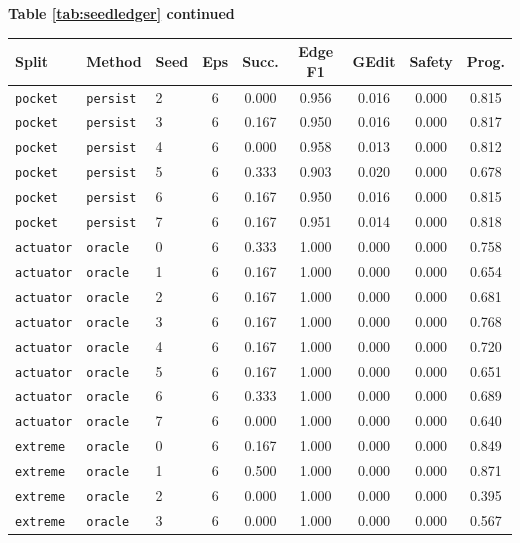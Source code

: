 \documentclass{article}
\begin{document}
\begin{center}
\textbf{Table \ref{tab:seedledger} continued}\\[0.4ex]
\begin{tabular}{lllcccccc}
\toprule
Split & Method & Seed & Eps & Succ. & Edge F1 & GEdit & Safety & Prog. \\
\midrule
\texttt{pocket} & \texttt{persist} & 2 & 6 & 0.000 & 0.956 & 0.016 & 0.000 & 0.815 \\
\texttt{pocket} & \texttt{persist} & 3 & 6 & 0.167 & 0.950 & 0.016 & 0.000 & 0.817 \\
\texttt{pocket} & \texttt{persist} & 4 & 6 & 0.000 & 0.958 & 0.013 & 0.000 & 0.812 \\
\texttt{pocket} & \texttt{persist} & 5 & 6 & 0.333 & 0.903 & 0.020 & 0.000 & 0.678 \\
\texttt{pocket} & \texttt{persist} & 6 & 6 & 0.167 & 0.950 & 0.016 & 0.000 & 0.815 \\
\texttt{pocket} & \texttt{persist} & 7 & 6 & 0.167 & 0.951 & 0.014 & 0.000 & 0.818 \\
\texttt{actuator} & \texttt{oracle} & 0 & 6 & 0.333 & 1.000 & 0.000 & 0.000 & 0.758 \\
\texttt{actuator} & \texttt{oracle} & 1 & 6 & 0.167 & 1.000 & 0.000 & 0.000 & 0.654 \\
\texttt{actuator} & \texttt{oracle} & 2 & 6 & 0.167 & 1.000 & 0.000 & 0.000 & 0.681 \\
\texttt{actuator} & \texttt{oracle} & 3 & 6 & 0.167 & 1.000 & 0.000 & 0.000 & 0.768 \\
\texttt{actuator} & \texttt{oracle} & 4 & 6 & 0.167 & 1.000 & 0.000 & 0.000 & 0.720 \\
\texttt{actuator} & \texttt{oracle} & 5 & 6 & 0.167 & 1.000 & 0.000 & 0.000 & 0.651 \\
\texttt{actuator} & \texttt{oracle} & 6 & 6 & 0.333 & 1.000 & 0.000 & 0.000 & 0.689 \\
\texttt{actuator} & \texttt{oracle} & 7 & 6 & 0.000 & 1.000 & 0.000 & 0.000 & 0.640 \\
\texttt{extreme} & \texttt{oracle} & 0 & 6 & 0.167 & 1.000 & 0.000 & 0.000 & 0.849 \\
\texttt{extreme} & \texttt{oracle} & 1 & 6 & 0.500 & 1.000 & 0.000 & 0.000 & 0.871 \\
\texttt{extreme} & \texttt{oracle} & 2 & 6 & 0.000 & 1.000 & 0.000 & 0.000 & 0.395 \\
\texttt{extreme} & \texttt{oracle} & 3 & 6 & 0.000 & 1.000 & 0.000 & 0.000 & 0.567 \\

\end{tabular}
\end{center}
\end{document}
